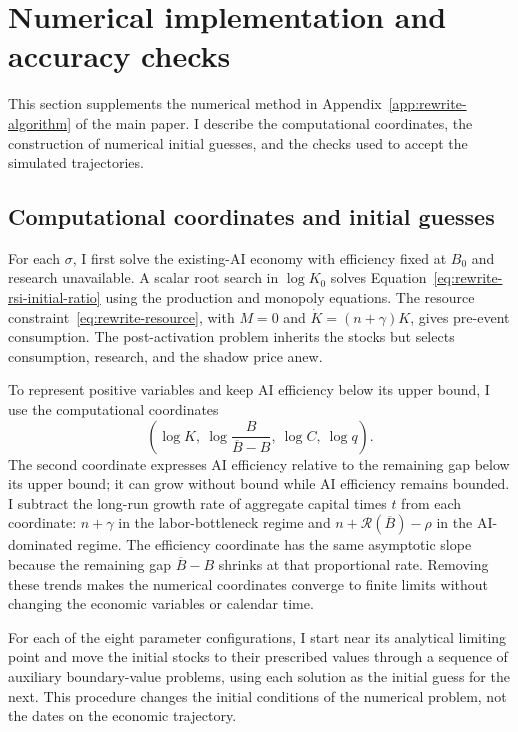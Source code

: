 \section{Numerical implementation and accuracy checks}
\label{app:rewrite-numerical-details}

This section supplements the numerical method in
Appendix~\ref{app:rewrite-algorithm} of the main paper. I describe the
computational coordinates, the construction of numerical initial guesses,
and the checks used to accept the simulated trajectories.

\subsection{Computational coordinates and initial guesses}

For each $\sigma$, I first solve the existing-AI economy with efficiency
fixed at $B_0$ and research unavailable. A scalar root search in $\log K_0$
solves Equation~\eqref{eq:rewrite-rsi-initial-ratio} using the production
and monopoly equations. The resource constraint~\eqref{eq:rewrite-resource},
with $M=0$ and $\dot K=(n+\gamma)K$, gives pre-event consumption.
The post-activation problem inherits the stocks but selects consumption,
research, and the shadow price anew.

To represent positive variables and keep AI efficiency below its upper
bound, I use the computational coordinates
\[
 \left(\log K,\ \log\frac{B}{\overline B-B},\ \log C,\ \log q\right).
\]
The second coordinate expresses AI efficiency relative to the remaining
gap below its upper bound; it can grow without bound while AI efficiency
remains bounded. I subtract the long-run growth rate of aggregate capital
times $t$ from each coordinate: $n+\gamma$ in the labor-bottleneck regime
and $n+\mathcal R(\overline B)-\rho$ in the AI-dominated regime.
The efficiency coordinate has the same asymptotic slope because the
remaining gap $\overline B-B$ shrinks at that proportional rate.
Removing these trends makes the numerical coordinates converge to finite
limits without changing the economic variables or calendar time.

For each of the eight parameter configurations, I start near its
analytical limiting point and move the initial stocks to their prescribed
values through a sequence of auxiliary boundary-value problems, using
each solution as the initial guess for the next. This procedure changes
the initial conditions of the numerical problem, not the dates on the
economic trajectory.

